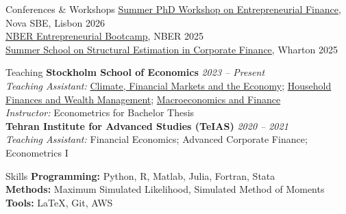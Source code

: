 \documentclass{resume}
\begin{document}
\begin{rSection}{Conferences \& Workshops}
  \vspace{-2pt}
  \href{https://entrepreneurial.finance/summer-phd-workshop/}{Summer PhD Workshop on Entrepreneurial Finance}, Nova SBE, Lisbon \hfill {2026} \\
  \href{https://www.nber.org/conferences/entrepreneurship-research-boot-camp-summer-2025}{NBER Entrepreneurial Bootcamp}, NBER \hfill {2025} \\
  \href{https://rodneywhitecenter.wharton.upenn.edu/2025-summer-school/}{Summer School on Structural Estimation in Corporate Finance}, Wharton \hfill {2025}
\end{rSection}

\begin{rSection}{Teaching}
  \vspace{-2pt}
  {\bf Stockholm School of Economics} \hfill {\em 2023 -- Present} \\[1pt]
  {\small \emph{Teaching Assistant:} \href{https://pcw.hhs.se/courses/4342}{Climate, Financial Markets and the Economy}; \href{https://pcw.hhs.se/courses/4327}{Household Finances and Wealth Management}; \href{https://pcw.hhs.se/courses/4330}{Macroeconomics and Finance}} \\[1pt]
  {\small \emph{Instructor:} Econometrics for Bachelor Thesis} \\[3pt]
  {\bf Tehran Institute for Advanced Studies (TeIAS)} \hfill {\em 2020 -- 2021} \\[1pt]
  {\small \emph{Teaching Assistant:} Financial Economics; Advanced Corporate Finance; Econometrics I}
\end{rSection}

\begin{rSection}{Skills}
  \vspace{-2pt}
  {\bf Programming:} Python, R, Matlab, Julia, Fortran, Stata \\
  {\bf Methods:} Maximum Simulated Likelihood, Simulated Method of Moments \\
  {\bf Tools:} \LaTeX, Git, AWS
\end{rSection}
\end{document}
